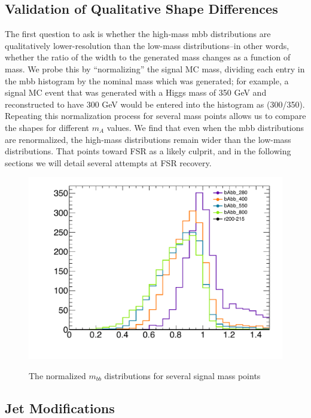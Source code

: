 \subsection{Validation of Qualitative Shape Differences}
The first question to ask is whether the high-mass mbb distributions are qualitatively lower-resolution than
the low-mass distributions–in other words, whether the ratio of the width to the generated mass changes
as a function of mass. We probe this by “normalizing” the signal MC mass, dividing each entry in the mbb
histogram by the nominal mass which was generated; for example, a signal MC event that was generated
with a Higgs mass of 350 GeV and reconstructed to have 300 GeV would be entered into the histogram
as (300/350). Repeating this normalization process for several mass points allows us to compare the
shapes for different $m_A$ values.
We find that even when the mbb distributions are renormalized, the high-mass distributions remain
wider than the low-mass distributions. That points toward FSR as a likely culprit, and in the following
sections we will detail several attempts at FSR recovery.
\begin{figure}[hbt]
  \includegraphics[width=0.78\linewidth]{SignalKin/mbb_normalized_signal.pdf}
  \label{fig:mbb_norm}
  \caption{The normalized $m_{bb}$ distributions for several signal mass points}
\end{figure}





\subsection{Jet Modifications}

